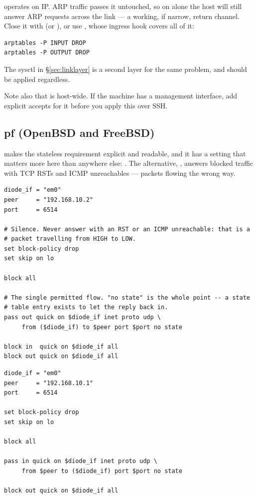 \documentclass[11pt,a4paper]{article}
\begin{document}
\begin{warnbox}
 operates on IP. ARP traffic passes it untouched, so on
 alone the \dstside{} host will still answer ARP requests
across the link --- a working, if narrow, return channel. Close it with
 (or ), or use , whose
 ingress hook covers all of it:
\begin{lstlisting}[style=shell]
arptables -P INPUT DROP
arptables -P OUTPUT DROP
\end{lstlisting}
The  sysctl in \S\ref{sec:linklayer} is a second layer for
the same problem, and should be applied regardless.
\end{warnbox}

Note also that  is host-wide. If the machine has a
management interface, add explicit accepts for it before you apply this over
SSH.

\subsection{pf (OpenBSD and FreeBSD)}

 makes the stateless requirement explicit and readable, and it has a
setting that matters more here than anywhere else: .
The alternative, , answers blocked traffic with TCP RSTs and ICMP
unreachables --- packets flowing the wrong way.

\begin{lstlisting}[style=pf,caption={\file{/etc/pf.conf} --- SOURCE host}]
diode_if = "em0"
peer     = "192.168.10.2"
port     = 6514

# Silence. Never answer with an RST or an ICMP unreachable: that is a
# packet travelling from HIGH to LOW.
set block-policy drop
set skip on lo

block all

# The single permitted flow. "no state" is the whole point -- a state
# table entry exists to let the reply back in.
pass out quick on $diode_if inet proto udp \
     from ($diode_if) to $peer port $port no state

block in  quick on $diode_if all
block out quick on $diode_if all
\end{lstlisting}

\begin{lstlisting}[style=pf,caption={\file{/etc/pf.conf} --- DESTINATION host}]
diode_if = "em0"
peer     = "192.168.10.1"
port     = 6514

set block-policy drop
set skip on lo

block all

pass in quick on $diode_if inet proto udp \
     from $peer to ($diode_if) port $port no state

block out quick on $diode_if all
\end{lstlisting}
\end{document}
